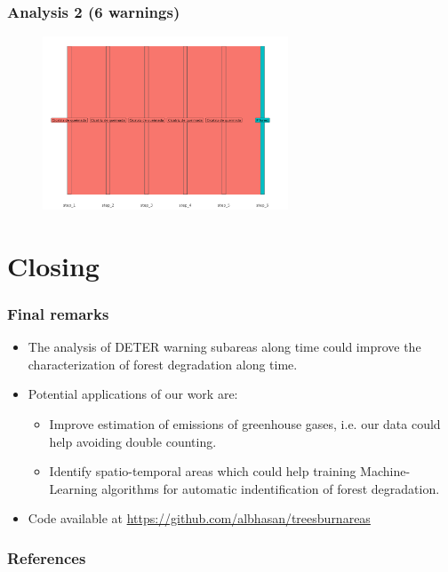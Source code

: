 \documentclass[aspectratio=169]{beamer}
\begin{document}
\begin{frame}
    \frametitle{Analysis 2 (6 warnings) }
    \begin{figure}[h] 
    \includegraphics[width=0.65\textwidth]{./figures/an2_plot_deter_prodes_subarea_trajectory_6.png}
    \end{figure}
\end{frame}



\section{Closing}

\begin{frame}
    \frametitle{Final remarks}
    \begin{itemize}
        \item The analysis of DETER warning subareas along time could improve 
            the characterization of forest degradation along time.
        \item Potential applications of our work are:
            \begin{itemize}
                \item Improve estimation of emissions of greenhouse gases, i.e.
                    our data could help avoiding double counting.
                \item Identify spatio-temporal areas which could help training 
                    Machine-Learning algorithms for automatic indentification 
                    of forest degradation.
            \end{itemize}
        \item Code available at 
            \url{https://github.com/albhasan/treesburnareas}
    \end{itemize}
\end{frame}

\begin{frame}[allowframebreaks]
    \frametitle{References}
    
    
\end{frame}
\end{document}
